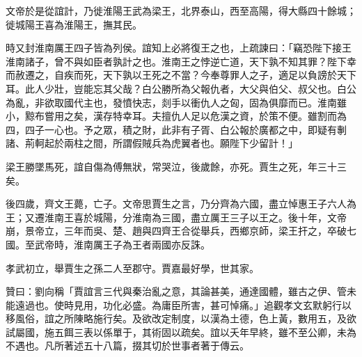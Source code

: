 \begin{pinyinscope}
文帝於是從誼計，乃徙淮陽王武為梁王，北界泰山，西至高陽，得大縣四十餘城；徙城陽王喜為淮陽王，撫其民。

時又封淮南厲王四子皆為列侯。誼知上必將復王之也，上疏諫曰：「竊恐陛下接王淮南諸子，曾不與如臣者孰計之也。淮南王之悖逆亡道，天下孰不知其罪？陛下幸而赦遷之，自疾而死，天下孰以王死之不當？今奉尊罪人之子，適足以負謗於天下耳。此人少壯，豈能忘其父哉？白公勝所為父報仇者，大父與伯父、叔父也。白公為亂，非欲取國代主也，發憤快志，剡手以衝仇人之匈，固為俱靡而已。淮南雖小，黥布嘗用之矣，漢存特幸耳。夫擅仇人足以危漢之資，於策不便。雖割而為四，四子一心也。予之眾，積之財，此非有子胥、白公報於廣都之中，即疑有剸諸、荊軻起於兩柱之間，所謂假賊兵為虎翼者也。願陛下少留計！」

梁王勝墜馬死，誼自傷為傅無狀，常哭泣，後歲餘，亦死。賈生之死，年三十三矣。

後四歲，齊文王薨，亡子。文帝思賈生之言，乃分齊為六國，盡立悼惠王子六人為王；又遷淮南王喜於城陽，分淮南為三國，盡立厲王三子以王之。後十年，文帝崩，景帝立，三年而吳、楚、趙與四齊王合從舉兵，西鄉京師，梁王扞之，卒破七國。至武帝時，淮南厲王子為王者兩國亦反誅。

孝武初立，舉賈生之孫二人至郡守。賈嘉最好學，世其家。

贊曰：劉向稱「賈誼言三代與秦治亂之意，其論甚美，通達國體，雖古之伊、管未能遠過也。使時見用，功化必盛。為庸臣所害，甚可悼痛。」追觀孝文玄默躬行以移風俗，誼之所陳略施行矣。及欲改定制度，以漢為土德，色上黃，數用五，及欲試屬國，施五餌三表以係單于，其術固以疏矣。誼以夭年早終，雖不至公卿，未為不遇也。凡所著述五十八篇，掇其切於世事者著于傳云。


\end{pinyinscope}